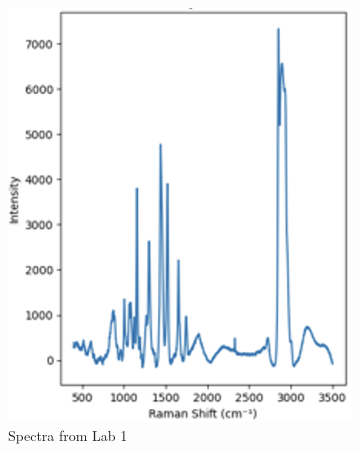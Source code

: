 \begin{figure}[htbp]
  \centering
  \begin{subfigure}[b]{0.45\textwidth}
    \centering
    \includegraphics[scale=0.6]{Figures/HORIBA.png}
    \caption{Spectra from Lab 1}
    \label{fig: horiba}
  \end{subfigure}
  \hfill
  \begin{subfigure}[b]{0.45\textwidth}
    \centering

\end{subfigure}
\end{figure}
